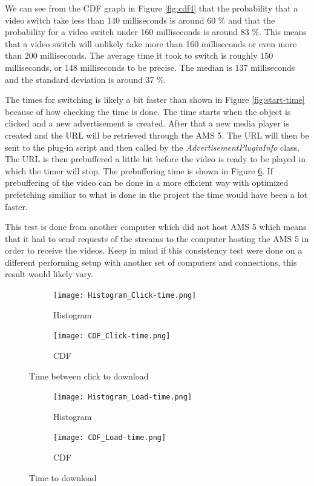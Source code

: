 We can see from the CDF graph in Figure \ref{fig:cdf4} that the probability that a video switch take less than 140 milliseconds is around 60 $\%$ and that the probability for a video switch under 160 milliseconds is around 83 $\%$. This means that a video switch will unlikely take more than 160 milliseconds or even more than 200 milliseconds.  The average time it took to switch is roughly 150 milliseconds, or 148 milliseconds to be precise. The median is 137 milliseconds and the standard deviation is around 37 $\%$.

The times for switching is likely a bit faster than shown in Figure \ref{fig:start-time} because of how checking the time is done. The time starts when the object is clicked and a new advertisement is created. After that a new media player is created and  the URL will be retrieved through the AMS 5. The URL will then be sent to the plug-in script and then called by the \textit{AdvertisementPluginInfo} class. The URL is then prebuffered a little bit before the video is ready to be played in which the timer will stop. The prebuffering time is shown in Figure \ref{fig:load-time}. If prebuffering of the video can be done in a more efficient way with optimized prefetching similiar to what is done in the project \cite{optimizedstreaming} the time would have been a lot faster. 

This test is done from another computer which did not host AMS 5 which means that it had to send requests of the streams to the computer hosting the AMS 5 in order to receive the videos. Keep in mind if this consistency test were done on a different performing setup with another set of computers and connections, this result would likely vary.

\hspace*{-2cm}
\begin{figure}[!ht]
\begin{subfigure}[b]{0.5\textwidth}
 	\texttt{[image: Histogram\_Click-time.png]}
  	\caption{Histogram}\label{fig:histogram}
    \end{subfigure}\hfill 
    \hspace{3px}
    \begin{subfigure}[b]{0.5\textwidth}
	 \texttt{[image: CDF\_Click-time.png]}
 	\caption{CDF}\label{fig:cdf}
    \end{subfigure}
	\caption{Time between click to download}
	\label{fig:click-time}
\end{figure}

\begin{figure}
\begin{subfigure}[b]{0.5\textwidth}
 	\texttt{[image: Histogram\_Load-time.png]}
  	\caption{Histogram}\label{fig:histogram2}
    \end{subfigure}\hfill 
    \hspace{3px}
    \begin{subfigure}[b]{0.5\textwidth}
	 \texttt{[image: CDF\_Load-time.png]}
 	\caption{CDF}\label{fig:cdf2}
    \end{subfigure}
	\caption{Time to download}
	\label{fig:load-time}
\end{figure}

